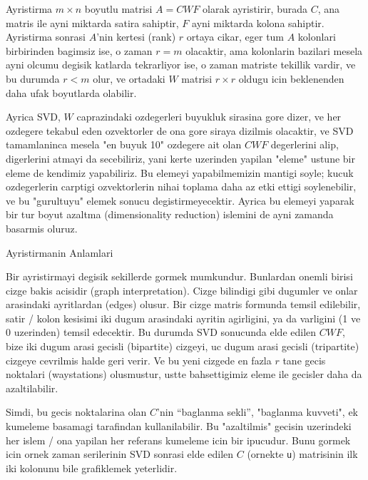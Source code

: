 \documentclass[12pt,fleqn]{article}\usepackage{../common}
\begin{document}
Ayristirma $m \times n$ boyutlu matrisi $A=CWF$ olarak ayristirir, burada
$C$, ana matris ile ayni miktarda satira sahiptir, $F$ ayni miktarda kolona
sahiptir. Ayristirma sonrasi $A$'nin kertesi (rank) $r$ ortaya cikar, eger
tum $A$ kolonlari birbirinden bagimsiz ise, o zaman $r=m$ olacaktir, ama
kolonlarin bazilari mesela ayni olcumu degisik katlarda tekrarliyor ise, o
zaman matriste tekillik vardir, ve bu durumda $r < m$ olur, ve ortadaki $W$
matrisi $r \times r$ oldugu icin beklenenden daha ufak boyutlarda
olabilir. 

Ayrica SVD, $W$ caprazindaki ozdegerleri buyukluk sirasina gore dizer, ve
her ozdegere tekabul eden ozvektorler de ona gore siraya dizilmis
olacaktir, ve SVD tamamlaninca mesela "en buyuk 10" ozdegere ait olan
$CWF$ degerlerini alip, digerlerini atmayi da secebiliriz, yani kerte
uzerinden yapilan "eleme" ustune bir eleme de kendimiz yapabiliriz. Bu
elemeyi yapabilmemizin mantigi soyle; kucuk ozdegerlerin carptigi
ozvektorlerin nihai toplama daha az etki ettigi soylenebilir, ve bu
"gurultuyu" elemek sonucu degistirmeyecektir. Ayrica bu elemeyi yaparak
bir tur boyut azaltma (dimensionality reduction) islemini de ayni zamanda
basarmis oluruz.

Ayristirmanin Anlamlari

Bir ayristirmayi degisik sekillerde gormek mumkundur. Bunlardan onemli
birisi cizge bakis acisidir (graph interpretation). Cizge bilindigi gibi
dugumler ve onlar arasindaki ayritlardan (edges) olusur. Bir cizge matris
formunda temsil edilebilir, satir / kolon kesisimi iki dugum arasindaki
ayritin agirligini, ya da varligini (1 ve 0 uzerinden) temsil edecektir. Bu
durumda SVD sonucunda elde edilen $CWF$, bize iki dugum arasi gecisli
(bipartite) cizgeyi, uc dugum arasi gecisli (tripartite) cizgeye cevrilmis
halde geri verir. Ve bu yeni cizgede en fazla $r$ tane gecis noktalari
(waystations) olusmustur, ustte bahsettigimiz eleme ile gecisler daha da
azaltilabilir. 

Simdi, bu gecis noktalarina olan $C$'nin ``baglanma sekli'', "baglanma
kuvveti", ek kumeleme basamagi tarafindan kullanilabilir. Bu
"azaltilmis" gecisin uzerindeki her islem / ona yapilan her referans
kumeleme icin bir ipucudur. Bunu gormek icin ornek zaman serilerinin
SVD sonrasi elde edilen $C$ (ornekte \verb!u!) matrisinin ilk
iki kolonunu bile grafiklemek yeterlidir.
\end{document}
